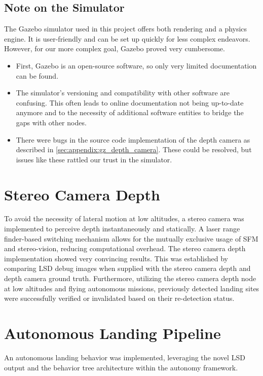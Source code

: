 \subsection{Note on the Simulator}

The Gazebo simulator used in this project offers both rendering and a physics engine. It is user-friendly and can be set up quickly for less complex endeavors. However, for our more complex goal, Gazebo proved very cumbersome. 

\begin{itemize}
    \item First, Gazebo is an open-source software, so only very limited documentation can be found.
    \item The simulator's versioning and compatibility with other software are confusing. This often leads to online documentation not being up-to-date anymore and to the necessity of additional software entities to bridge the gaps with other nodes.
    \item There were bugs in the source code implementation of the depth camera as described in \cref{sec:appendix:gz_depth_camera}. These could be resolved, but issues like these rattled our trust in the simulator.
\end{itemize}

\section{Stereo Camera Depth}

To avoid the necessity of lateral motion at low altitudes, a stereo camera was implemented to perceive depth instantaneously and statically. A laser range finder-based switching mechanism allows for the mutually exclusive usage of SFM and stereo-vision, reducing computational overhead. The stereo camera depth implementation showed very convincing results. This was established by comparing LSD debug images when supplied with the stereo camera depth and depth camera ground truth. Furthermore, utilizing the stereo camera depth node at low altitudes and flying autonomous missions, previously detected landing sites were successfully verified or invalidated based on their re-detection status.

\section{Autonomous Landing Pipeline}
An autonomous landing behavior was implemented, leveraging the novel LSD output and the behavior tree architecture within the autonomy framework.

